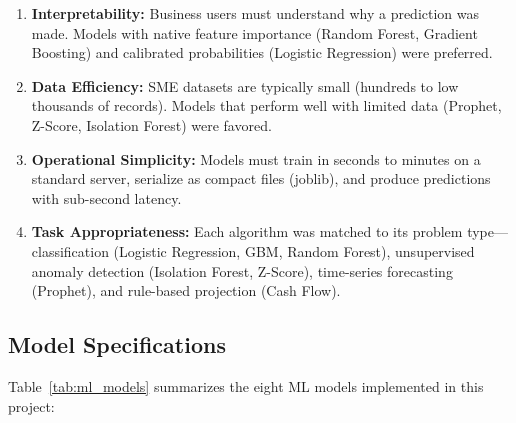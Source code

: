 \documentclass[12pt,a4paper]{report}
\begin{document}
\begin{enumerate}[label=\arabic*.]
  \item \textbf{Interpretability:} Business users must understand why a prediction was made. Models with native feature importance (Random Forest, Gradient Boosting) and calibrated probabilities (Logistic Regression) were preferred.

  \item \textbf{Data Efficiency:} SME datasets are typically small (hundreds to low thousands of records). Models that perform well with limited data (Prophet, Z-Score, Isolation Forest) were favored.

  \item \textbf{Operational Simplicity:} Models must train in seconds to minutes on a standard server, serialize as compact files (joblib), and produce predictions with sub-second latency.

  \item \textbf{Task Appropriateness:} Each algorithm was matched to its problem type---classification (Logistic Regression, GBM, Random Forest), unsupervised anomaly detection (Isolation Forest, Z-Score), time-series forecasting (Prophet), and rule-based projection (Cash Flow).
\end{enumerate}

\subsection{Model Specifications}

Table~\ref{tab:ml_models} summarizes the eight ML models implemented in this project:
\end{document}
